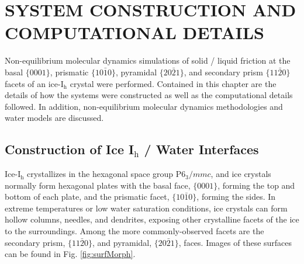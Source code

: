 \newcommand*{\citen}[1]{%
  \begingroup
    \romannumeral-`\x %
    \setcitestyle{numbers}%
    \cite{#1}%
  \endgroup   
}

\chapter{SYSTEM CONSTRUCTION AND COMPUTATIONAL DETAILS}

Non-equilibrium molecular dynamics simulations of solid / liquid
friction at the basal $\{0001\}$, prismatic $\{10\bar{1}0\}$,
pyramidal $\{20\bar{2}1\}$, and secondary prism $\{11\bar{2}0\}$
facets of an ice-I$_\mathrm{h}$ crystal were performed. Contained in
this chapter are the details of how the systems were constructed as
well as the computational details followed. In addition,
non-equilibrium molecular dynamics methodologies and water models are
discussed.


\section{Construction of Ice I$_\mathrm{h}$ / Water Interfaces}

Ice-I$_\mathrm{h}$ crystallizes in the hexagonal space group
P$6_3/mmc$, and ice crystals normally form hexagonal plates with the
basal face, $\{0001\}$, forming the top and bottom of each plate, and
the prismatic facet, $\{10\bar{1}0\}$, forming the sides.  In extreme
temperatures or low water saturation conditions, ice crystals can form
hollow columns, needles, and dendrites, exposing other crystalline
facets of the ice to the surroundings.  Among the more
commonly-observed facets are the secondary prism, $\{11\bar{2}0\}$,
and pyramidal, $\{20\bar{2}1\}$, faces. Images of these surfaces can
be found in Fig. \ref{fig:surfMorph}.


